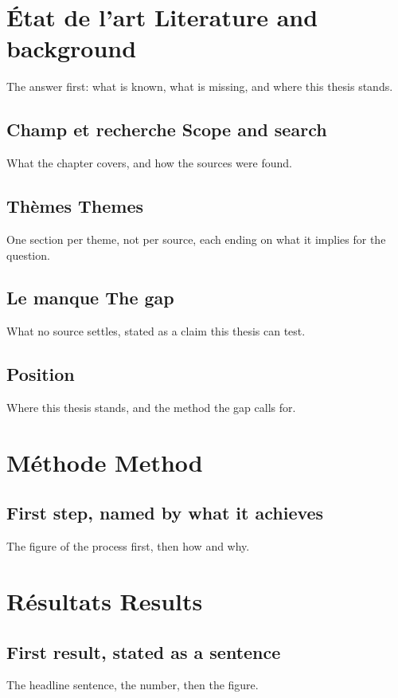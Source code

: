 \documentclass[11pt,a4paper]{article}
\newcommand{\bi}[2]{#1 \textperiodcentered{} #2}
\begin{document}
\section{\bi{État de l'art}{Literature and background}}
The answer first: what is known, what is missing, and where this thesis stands.

\subsection*{\bi{Champ et recherche}{Scope and search}}
What the chapter covers, and how the sources were found.

\subsection*{\bi{Thèmes}{Themes}}
One section per theme, not per source, each ending on what it implies for the question.

\subsection*{\bi{Le manque}{The gap}}
What no source settles, stated as a claim this thesis can test.

\subsection*{Position}
Where this thesis stands, and the method the gap calls for.

\section{\bi{Méthode}{Method}}
\subsection{First step, named by what it achieves}
The figure of the process first, then how and why.

\section{\bi{Résultats}{Results}}
\subsection{First result, stated as a sentence}
The headline sentence, the number, then the figure.
\end{document}
